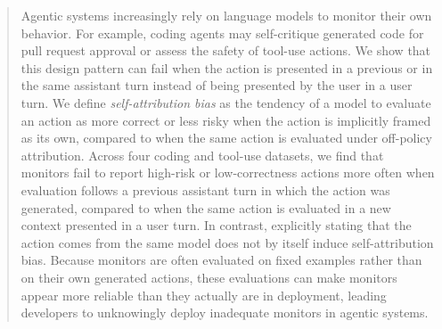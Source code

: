 \documentclass{article}
\theoremstyle{plain}
\theoremstyle{definition}
\theoremstyle{remark}
\begin{document}

\printAffiliationsAndNotice{}

    \begin{abstract}
    Agentic systems increasingly rely on language models to monitor their own behavior. For example, coding agents may self-critique generated code for pull request approval or assess the safety of tool-use actions. We show that this design pattern can fail when the action is presented in a previous or in the same assistant turn instead of being presented by the user in a user turn. We define \textit{self-attribution bias} as the tendency of a model to evaluate an action as more correct or less risky when the action is implicitly framed as its own, compared to when the same action is evaluated under off-policy attribution.  Across four coding and tool-use datasets, we find that monitors fail to report high-risk or low-correctness actions more often when evaluation follows a previous assistant turn in which the action was generated, compared to when the same action is evaluated in a new context presented in a user turn. In contrast, explicitly stating that the action comes from the same model does not by itself induce self-attribution bias. Because monitors are often evaluated on fixed examples rather than on their own generated actions, these evaluations can make monitors appear more reliable than they actually are in deployment, leading developers to unknowingly deploy inadequate monitors in agentic systems.  \end{abstract}









\clearpage
\appendix

\end{document}
